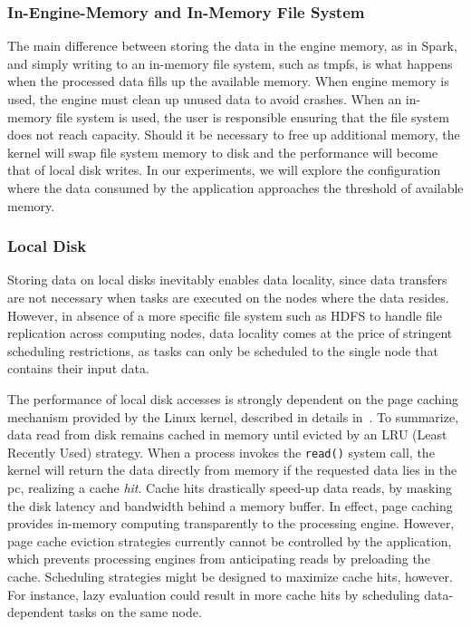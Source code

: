 \subsubsection{In-Engine-Memory and In-Memory File System} 

 The main difference between storing the data in the engine memory, as in Spark,
 and simply writing to an in-memory file system, such as tmpfs, is what happens
 when the processed data fills up the available memory. When engine memory is
 used, the engine must clean up unused data to avoid crashes. When an in-memory
 file system is used, the user is responsible ensuring that the file system does
 not reach capacity. Should it be necessary to free up additional memory, the
 kernel will swap file system memory to disk and the performance will become that
 of local disk writes. In our experiments, we will explore the configuration
 where the data consumed by the application approaches the threshold of
 available memory.

\subsubsection{Local Disk} %


Storing data on local disks inevitably enables data locality, since data
transfers are not necessary when tasks are executed on the nodes where the data
resides. However, in absence of a more specific file system such as HDFS to
handle file replication across computing nodes, data locality comes at the price
of stringent scheduling restrictions, as tasks can only be scheduled to the
single node that contains their input data.


The performance of local disk accesses is strongly dependent on the page caching
mechanism provided by the Linux kernel, described in    
details in~\cite{love2010linux}. To summarize, data read from disk remains
cached in memory until evicted by an LRU (Least Recently Used) strategy. When a
process invokes the \texttt{read()} system call, the kernel will return the data
directly from memory if the requested data lies in the \gls{pc}, realizing a
cache \emph{hit}. Cache hits drastically speed-up data reads, by masking the
disk latency and bandwidth behind a memory buffer. In effect, page caching
provides in-memory computing transparently to the processing engine. However,
page cache eviction strategies currently cannot be controlled by the
application, which prevents processing engines from anticipating reads by
preloading the cache. Scheduling strategies might be designed to maximize cache
hits, however. For instance, lazy evaluation could result in more cache hits by
scheduling data-dependent tasks on the same node.

